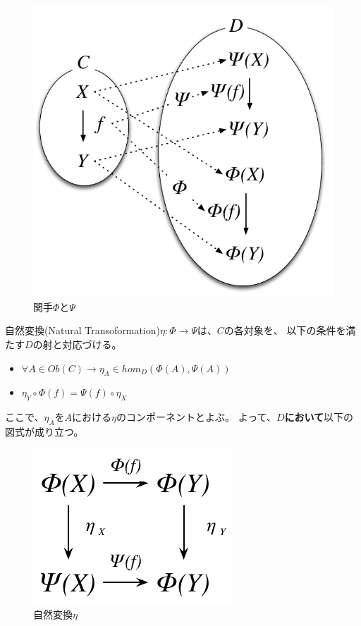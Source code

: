 \documentclass{jsarticle}
\begin{document}
\begin{figure}[htbp]
    \centering
    \includegraphics{diag_nt.pdf}
    \caption{関手$\Phi$と$\Psi$}
\end{figure}

自然変換(Natural Transoformation)$\eta:\Phi\to\Psi$は、$C$の各対象を、
以下の条件を満たす$D$の射と対応づける。
\begin{itemize}
    \item $\forall A\in Ob(C)\to \eta_A\in hom_D(\Phi(A),\Psi(A))$
    \item $\eta_Y\circ \Phi(f)=\Psi(f)\circ\eta_X$
\end{itemize}
ここで、$\eta_A$を$A$における$\eta$のコンポーネントとよぶ。
よって、\textbf{$D$において}以下の図式が成り立つ。

\begin{figure}[htbp]
    \centering
    \includegraphics{diag_nt2.pdf}
    \caption{自然変換$\eta$}
\end{figure}
\end{document}
